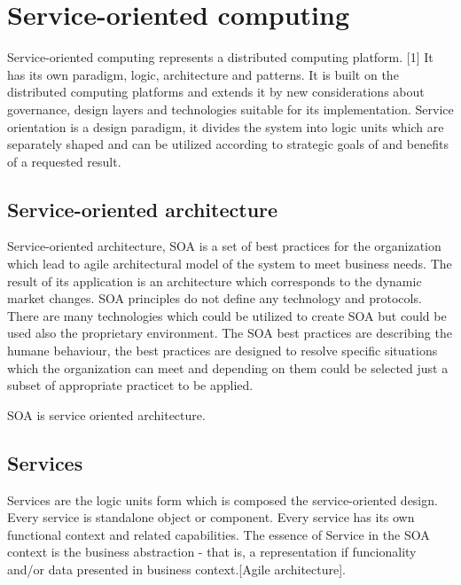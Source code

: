 \chapter{Service-oriented computing}
\label{chap:service-oriented computing}
Service-oriented computing represents a distributed computing platform. [1] It has its own paradigm, logic, architecture and patterns. It is built on the distributed computing platforms and extends it by new considerations about governance, design layers and technologies suitable for its implementation.
Service orientation is a design paradigm, it divides the system into logic units which are separately shaped and can be utilized according to strategic goals of and benefits of a requested result.

\section{Service-oriented architecture}
Service-oriented architecture, SOA is a set of best practices for the organization which lead to agile architectural model of the system to meet business needs. The result of its application is an architecture which corresponds to the dynamic market changes. SOA principles do not define any technology and protocols. There are many technologies which could be utilized to create SOA but could be used also the proprietary environment. 
The SOA best practices are describing the humane behaviour, the best practices are designed to resolve specific situations which the organization can meet and depending on them could be selected just a subset of appropriate practicet to be applied.

SOA is service oriented architecture.

\section{Services}
Services are the logic units form which is composed the service-oriented design. Every service is standalone object or component. Every service has its own functional context and related capabilities. 
The essence of Service in the SOA context is the business abstraction - that is, a representation if funcionality and/or data presented in business context.[Agile architecture].

